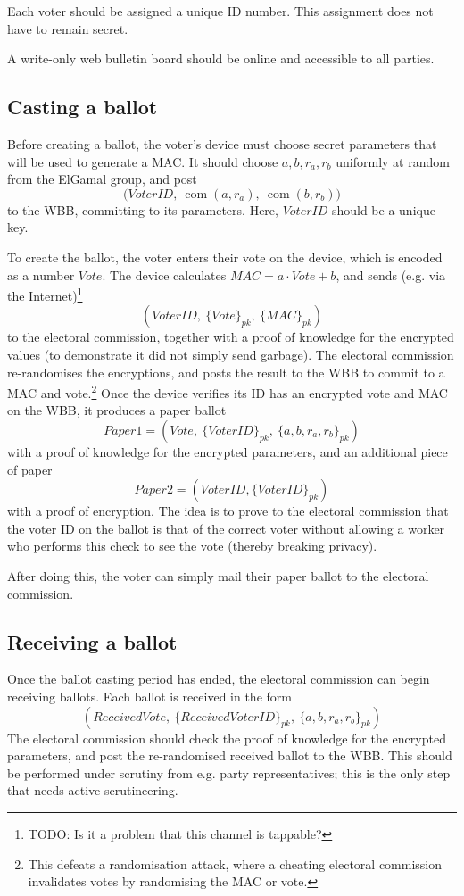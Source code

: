 \documentclass[11pt,twoside,a4paper]{article}
\DeclareMathOperator{\com}{com}
\theoremstyle{definition}
\begin{document}
Each voter should be assigned a unique ID number. This assignment does not have to remain secret.

A write-only web bulletin board should be online and accessible to all parties.
\subsection{Casting a ballot}
Before creating a ballot, the voter's device must choose secret parameters that will be used to generate a MAC. It should choose \(a,b,r_a,r_b\) uniformly at random from the ElGamal group, and post
\[\big(VoterID,\ \com(a,r_a),\ \com(b,r_b)\big)\]
to the WBB, committing to its parameters. Here, \(VoterID\) should be a unique key.

To create the ballot, the voter enters their vote on the device, which is encoded as a number \(Vote\). The device calculates \(MAC=a\cdot Vote+b\), and sends (e.g. via the Internet)\footnote{TODO: Is it a problem that this channel is tappable?}
\[\left(VoterID,\ \{Vote\}_{pk},\ \{MAC\}_{pk}\right)\]
to the electoral commission, together with a proof of knowledge for the encrypted values (to demonstrate it did not simply send garbage). The electoral commission re-randomises the encryptions, and posts the result to the WBB to commit to a MAC and vote.\footnote{This defeats a randomisation attack, where a cheating electoral commission invalidates votes by randomising the MAC or vote.} Once the device verifies its ID has an encrypted vote and MAC on the WBB, it produces a paper ballot
\[\textit{Paper1} = \left(Vote,\ \{VoterID\}_{pk},\ \{a,b,r_a,r_b\}_{pk}\right)\]
with a proof of knowledge for the encrypted parameters, and an additional piece of paper
\[\textit{Paper2} = \left(VoterID, \{VoterID\}_{pk}\right)\]
with a proof of encryption. The idea is to prove to the electoral commission that the voter ID on the ballot is that of the correct voter without allowing a worker who performs this check to see the vote (thereby breaking privacy).

After doing this, the voter can simply mail their paper ballot to the electoral commission.
\subsection{Receiving a ballot}
Once the ballot casting period has ended, the electoral commission can begin receiving ballots. Each ballot is received in the form
\[\left(ReceivedVote,\ \{ReceivedVoterID\}_{pk},\ \{a,b,r_a,r_b\}_{pk}\right)\]
The electoral commission should check the proof of knowledge for the encrypted parameters, and post the re-randomised received ballot to the WBB. This should be performed under scrutiny from e.g. party representatives; this is the only step that needs active scrutineering.
\end{document}
